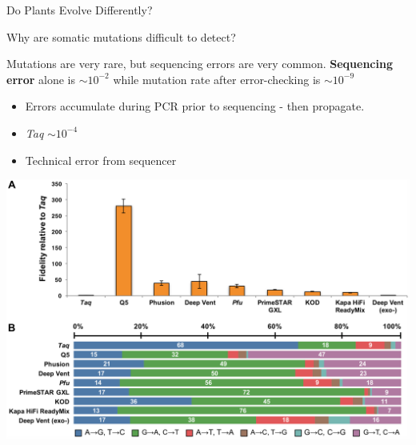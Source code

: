 \documentclass{beamer}
\begin{document}
\begin{frame}{Do Plants Evolve Differently?}




\end{frame}

\begin{frame}{Why are somatic mutations difficult to detect?}

\begin{block}{Mutations are very rare, but sequencing errors are very common.}
\textbf{Sequencing error} alone is \textbf{$\sim10^{-2}$} while mutation rate after error-checking is \textbf{$\sim10^{-9}$}
\end{block}

\begin{itemize}
\item Errors accumulate during PCR prior to sequencing - then propagate.
\item \textit{Taq} $\sim10^{-4}$
\item Technical error from sequencer
\end{itemize}

\includegraphics[trim={1cm 4cm 0 0},clip,width=\linewidth]{pcr_errors.png}


\end{frame}
\end{document}
